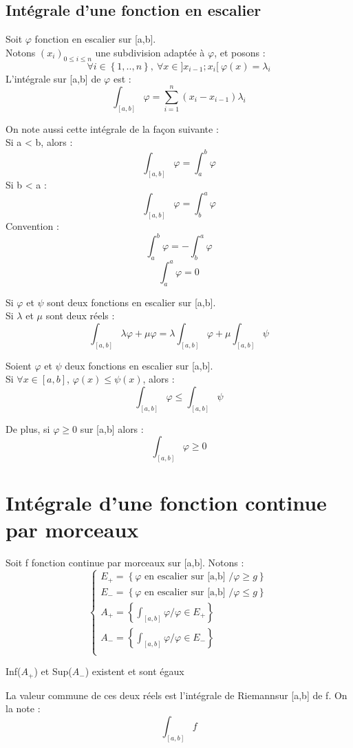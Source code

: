 \subsection{Intégrale d'une fonction en escalier}
\begin{de}
Soit $\varphi$ fonction en escalier sur [a,b].\\
Notons $(x_i)_{0 \leq i \leq n}$ une subdivision adaptée à $\varphi$, et posons : 
$$\forall i \in \left\lbrace 1,..,n\right\rbrace,~ \forall x \in ]x_{i-1};x_i[~ \varphi(x) = \lambda_i$$
L'intégrale sur [a,b] de $\varphi$ est : 
$$\int_{[a,b]}\varphi = \sum_{i=1}^n(x_i - x_{i-1})\lambda_i$$
\end{de}
On note aussi cette intégrale de la façon suivante :\\
Si a < b, alors :
$$\int_{[a,b]}\varphi = \int_a^b\varphi$$
Si b < a : 
$$\int_{[a,b]}\varphi = \int_b^a\varphi$$
Convention : 
$$\int_a^b\varphi =-\int_b^a\varphi$$
$$\int_a^a\varphi = 0$$
\begin{prop}
Si $\varphi$ et $\psi$ sont deux fonctions en escalier sur [a,b].\\
Si $\lambda$ et $\mu$ sont deux réels :
$$\int_{[a,b]}\lambda\varphi + \mu\varphi = \lambda\int_{[a,b]}\varphi + \mu\int_{[a,b]}\psi$$
\end{prop}
\begin{prop}
Soient $\varphi$ et $\psi$ deux fonctions en escalier sur [a,b].\\
Si $\forall x \in [a,b]$, $\varphi(x) \leq \psi(x)$, alors :
$$\int_{[a,b]}\varphi \leq \int_{[a,b]}\psi$$
\end{prop}
De plus, si $\varphi \geq 0$ sur [a,b] alors : 
$$\int_{[a,b]}\varphi \geq 0$$
\section{Intégrale d'une fonction continue par morceaux}
Soit f fonction continue par morceaux sur [a,b]. Notons :
\[\left\{\begin{array}{l}
   E_+ = \left\lbrace \varphi \mbox{ en escalier sur [a,b] } / \varphi \geq g \right\rbrace \\
   E_- = \left\lbrace \varphi \mbox{ en escalier sur [a,b] } / \varphi \leq g \right\rbrace \\
   A_+ = \left\lbrace \int_{[a,b]} \varphi / \varphi \in E_+ \right\rbrace\\
   A_- = \left\lbrace \int_{[a,b]} \varphi / \varphi \in E_- \right\rbrace\\
  \end{array}\right.
\]
\begin{prop}
 Inf($A_+$) et Sup($A_-$) existent et sont égaux
\end{prop}
\begin{de}
 La valeur commune de ces deux réels est l'intégrale de Riemannsur [a,b] de f. On la note :
$$\int_{[a,b]}f$$
\end{de}
